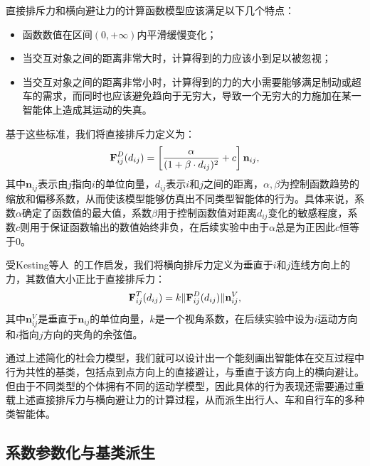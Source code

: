 直接排斥力和横向避让力的计算函数模型应该满足以下几个特点：
\begin{itemize}
    \item 函数数值在区间$(0, +\infty)$内平滑缓慢变化；
    \item 当交互对象之间的距离非常大时，计算得到的力应该小到足以被忽视；
    \item 当交互对象之间的距离非常小时，计算得到的力的大小需要能够满足制动或超车的需求，而同时也应该避免趋向于无穷大，导致一个无穷大的力施加在某一智能体上造成其运动的失真。
\end{itemize}

基于这些标准，我们将直接排斥力定义为：
\begin{equation}
\setlength\abovedisplayskip{6pt}
\setlength\belowdisplayskip{6pt}
\label{eq:simplified_directrepulsion}
    \textbf{F}_{ij}^D(d_{ij}) = \left[ \frac{\alpha}{(1 + \beta \cdot d_{ij})^2} + c \right] \textbf{n}_{ij},
\end{equation}
其中$\textbf{n}_{ij}$表示由$j$指向$i$的单位向量，$d_{ij}$表示$i$和$j$之间的距离，$\alpha, \beta$为控制函数趋势的缩放和偏移系数，从而使该模型能够仿真出不同类型智能体的行为。具体来说，系数$\alpha$确定了函数值的最大值，系数$\beta$用于控制函数值对距离$d_{ij}$变化的敏感程度，系数$c$则用于保证函数输出的数值始终非负，在后续实验中由于$\alpha$总是为正因此$c$恒等于0。

受Kesting等人~\cite{kesting2007general}的工作启发，我们将横向排斥力定义为垂直于$i$和$j$连线方向上的力，其数值大小正比于直接排斥力：
\begin{equation}
\setlength\abovedisplayskip{6pt}
\setlength\belowdisplayskip{6pt}
\label{eq:simplified_latealavoidance}
    \textbf{F}_{ij}^T(d_{ij}) = k \| \textbf{F}_{ij}^D(d_{ij}) \| \textbf{n}_{ij}^V,
\end{equation}
其中$\textbf{n}_{ij}^V$是垂直于$\textbf{n}_{ij}$的单位向量，$k$是一个视角系数，在后续实验中设为$i$运动方向和$i$指向$j$方向的夹角的余弦值。

通过上述简化的社会力模型，我们就可以设计出一个能刻画出智能体在交互过程中行为共性的基类，包括点到点方向上的直接避让，与垂直于该方向上的横向避让。但由于不同类型的个体拥有不同的运动学模型，因此具体的行为表现还需要通过重载上述直接排斥力与横向避让力的计算过程，从而派生出行人、车和自行车的多种类智能体。


\subsection{系数参数化与基类派生}
\label{section:simplified_parameterize}


